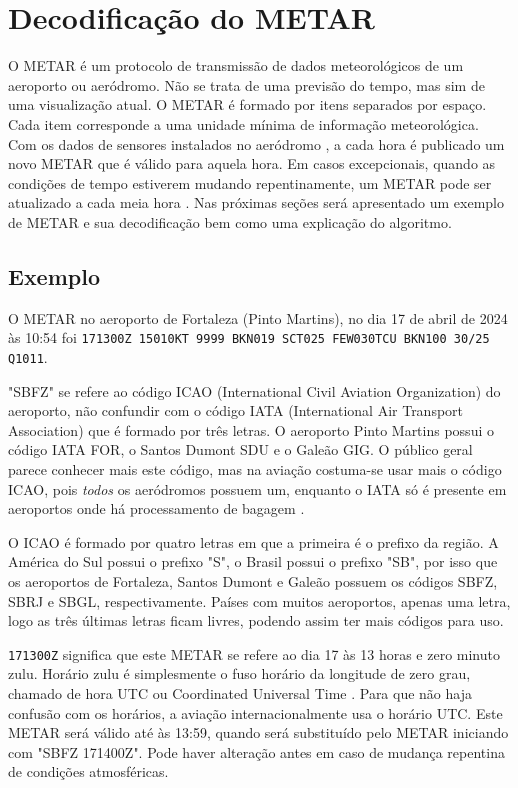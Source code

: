 \chapter{Decodificação do METAR}

O METAR é um protocolo de transmissão de dados meteorológicos de um aeroporto ou aeródromo. Não se trata de 
uma previsão do tempo, mas sim de uma visualização atual. O METAR é formado por itens separados por espaço. 
Cada item corresponde a uma unidade mínima de informação meteorológica. Com os dados de sensores instalados 
no aeródromo \cite{metar-weather-gov}, a cada hora é publicado um novo METAR que é válido para aquela hora. 
Em casos excepcionais, quando as condições de tempo estiverem mudando repentinamente, um METAR pode ser atualizado 
a cada meia hora \cite{METAR-speci}. Nas próximas seções será apresentado um exemplo de METAR e sua 
decodificação bem como uma explicação do algoritmo.

\section{Exemplo}
O METAR no aeroporto de Fortaleza (Pinto Martins)\cite{METAR-sbfz}, no dia 17 de abril de 2024 às 10:54 foi
\texttt{171300Z 15010KT 9999 BKN019 SCT025 FEW030TCU BKN100 30/25 Q1011}.

"SBFZ" se refere ao código ICAO (International Civil Aviation Organization) do aeroporto, não confundir 
com o código IATA (International Air Transport Association) que é formado por três letras. O aeroporto Pinto 
Martins possui o código IATA FOR, o Santos Dumont SDU e o Galeão GIG. O público geral parece conhecer mais este 
código, mas na aviação costuma-se usar mais o código ICAO, pois \textit{todos} os aeródromos possuem um, 
enquanto o IATA só é presente em aeroportos onde há processamento de bagagem \cite{iata-codes} \cite{icao-codes}.

O ICAO é formado por quatro letras em que a primeira é o prefixo da região. A América do Sul possui o prefixo "S", 
o Brasil possui o prefixo "SB", por isso que os aeroportos de Fortaleza, Santos Dumont e Galeão possuem os códigos 
SBFZ, SBRJ e SBGL, respectivamente. Países com muitos aeroportos, apenas uma letra, 
logo as três últimas letras ficam livres, podendo assim ter mais códigos para uso.

\texttt{171300Z} significa que este METAR se refere ao dia 17 às 13 horas e zero minuto zulu. Horário zulu é 
simplesmente o fuso horário da longitude de zero grau, chamado de hora UTC ou Coordinated Universal Time \cite{UTC}. 
Para que não haja confusão com os horários, a aviação internacionalmente usa o horário UTC. Este METAR será 
válido até às 13:59, quando será substituído pelo METAR iniciando com "SBFZ 171400Z". Pode haver alteração antes
em caso de mudança repentina de condições atmosféricas.

